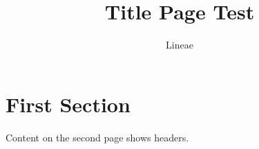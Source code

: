 \documentclass[10pt,twoside]{article}
\title{Title Page Test}
\author{Lineae}
\begin{document}
\maketitle
\section{First Section}
Content on the second page shows headers.
\end{document}
